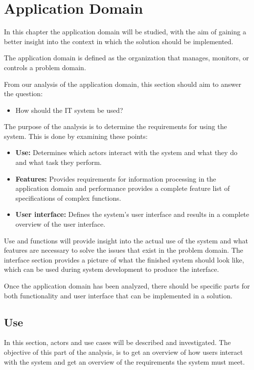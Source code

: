 \section{Application Domain}

In this chapter the application domain will be studied, with the aim of gaining a better insight into the context in which the solution should be implemented.


The application domain is defined as the organization that manages, monitors, or controls a problem domain.

From our analysis of the application domain, this section should aim to answer the question:
\begin{itemize}
    \item How should the IT system be used?
\end{itemize}


The purpose of the analysis is to determine the requirements for using the system. This is done by examining these points:
\begin{itemize}
\item \textbf{Use:} Determines which actors interact with the system and what they do and what task they perform.

\item \textbf{Features:} Provides requirements for information processing in the application domain and performance
provides a complete feature list of specifications of complex functions.
\item \textbf{User interface:} Defines the system's user interface and results in a complete overview of the user interface.
\end{itemize}

Use and functions will provide insight into the actual use of the system and what features are
necessary to solve the issues that exist in the problem domain.
The interface section provides a picture of what the finished system should look like, which can be used during system development to produce the interface.

Once the application domain has been analyzed, there should be specific parts for both functionality and user interface that can be implemented in a solution.

\subsection{Use}
In this section, actors and use cases will be described and investigated. The objective of this part of the analysis, is to get an overview of how users interact with the system and get an overview of the requirements the system must meet.

